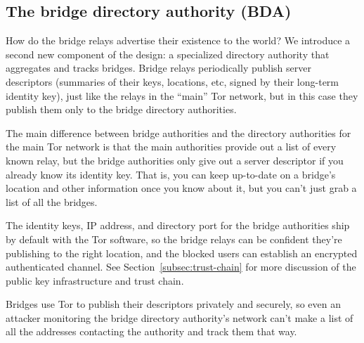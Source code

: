 \documentclass{llncs}
\begin{document}
\subsection{The bridge directory authority (BDA)}

How do the bridge relays advertise their existence to the world? We
introduce a second new component of the design: a specialized directory
authority that aggregates and tracks bridges. Bridge relays periodically
publish server descriptors (summaries of their keys, locations, etc,
signed by their long-term identity key), just like the relays in the
``main'' Tor network, but in this case they publish them only to the
bridge directory authorities.

The main difference between bridge authorities and the directory
authorities for the main Tor network is that the main authorities provide
out a list of every known relay, but the bridge authorities only give
out a server descriptor if you already know its identity key. That is,
you can keep up-to-date on a bridge's location and other information
once you know about it, but you can't just grab a list of all the bridges.

The identity keys, IP address, and directory port for the bridge
authorities ship by default with the Tor software, so the bridge relays
can be confident they're publishing to the right location, and the
blocked users can establish an encrypted authenticated channel. See
Section~\ref{subsec:trust-chain} for more discussion of the public key
infrastructure and trust chain.

Bridges use Tor to publish their descriptors privately and securely,
so even an attacker monitoring the bridge directory authority's network
can't make a list of all the addresses contacting the authority and
track them that way.

%
%
%
%
%
\end{document}
